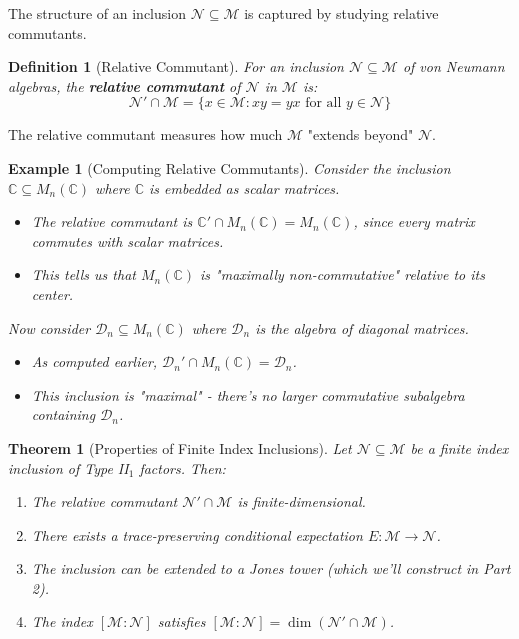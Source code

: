 \documentclass[11pt, a4paper]{article}
\theoremstyle{colored_def}
\newtheorem{definition}{Definition}[section]
\theoremstyle{colored_thm}
\newtheorem{theorem}{Theorem}[section]
\theoremstyle{colored_ex}
\newtheorem{example}{Example}[section]
\newcommand{\C}{\mathbb{C}}
\newcommand{\M}{\mathcal{M}}
\newcommand{\N}{\mathcal{N}}
\begin{document}
The structure of an inclusion $\N \subseteq \M$ is captured by studying relative commutants.

\begin{definition}[Relative Commutant]
For an inclusion $\N \subseteq \M$ of von Neumann algebras, the \textbf{relative commutant} of $\N$ in $\M$ is:
$$ \N' \cap \M = \{x \in \M : xy = yx \text{ for all } y \in \N\} $$
\end{definition}

The relative commutant measures how much $\M$ "extends beyond" $\N$.

\begin{example}[Computing Relative Commutants]\label{ex:relative-commutant}
Consider the inclusion $\C \subseteq M_n(\C)$ where $\C$ is embedded as scalar matrices.

\begin{itemize}
    \item The relative commutant is $\C' \cap M_n(\C) = M_n(\C)$, since every matrix commutes with scalar matrices.
    \item This tells us that $M_n(\C)$ is "maximally non-commutative" relative to its center.
\end{itemize}

Now consider $\mathcal{D}_n \subseteq M_n(\C)$ where $\mathcal{D}_n$ is the algebra of diagonal matrices.

\begin{itemize}
    \item As computed earlier, $\mathcal{D}_n' \cap M_n(\C) = \mathcal{D}_n$.
    \item This inclusion is "maximal" - there's no larger commutative subalgebra containing $\mathcal{D}_n$.
\end{itemize}
\end{example}

\begin{theorem}[Properties of Finite Index Inclusions]
Let $\N \subseteq \M$ be a finite index inclusion of Type II$_1$ factors. Then:
\begin{enumerate}
    \item The relative commutant $\N' \cap \M$ is finite-dimensional.
    \item There exists a trace-preserving conditional expectation $E: \M \to \N$.
    \item The inclusion can be extended to a Jones tower (which we'll construct in Part 2).
    \item The index $[\M : \N]$ satisfies $[\M : \N] = \dim(\N' \cap \M)$.
\end{enumerate}
\end{theorem}
\end{document}
